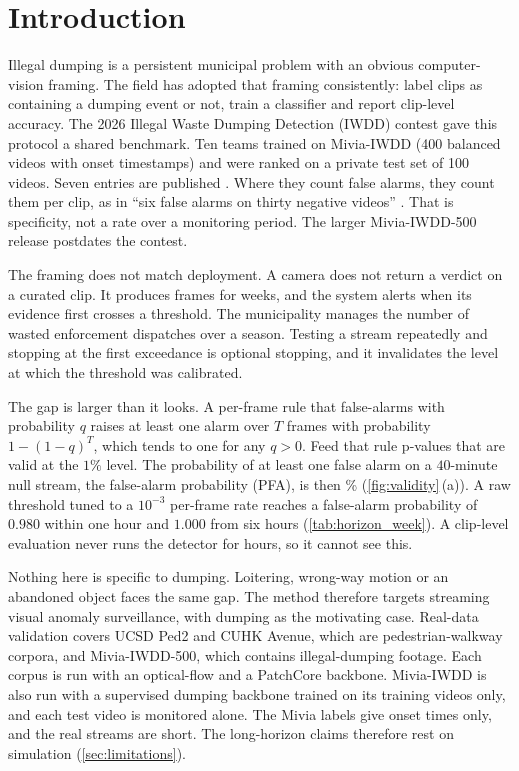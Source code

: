 \section{Introduction}
\label{sec:intro}

Illegal dumping is a persistent municipal problem with an obvious
computer-vision framing. The field has adopted that framing consistently: label
clips as containing a dumping event or not, train a classifier and report
clip-level accuracy. The 2026 Illegal Waste Dumping Detection (IWDD) contest \citep{bouwmans2026overview} gave this
protocol a shared benchmark. Ten teams trained on Mivia-IWDD (400 balanced
videos with onset timestamps) and were ranked on a private test set of 100 videos.
Seven entries are published
\citep{almorsy2026x3d,kim2026kfold,scarrica2026garberus,kairanbay2026vlm,zbuce2026novelty,bhat2026imslab,putzu2026unicass}.
Where they count false alarms, they count them per clip, as in ``six false alarms
on thirty negative videos'' \citep{almorsy2026x3d}. That is specificity, not a
rate over a monitoring period. The larger Mivia-IWDD-500 release
\citep{greco2026iwdd} postdates the contest.

The framing does not match deployment. A camera does not return a verdict on a
curated clip. It produces frames for weeks, and the system alerts when its
evidence first crosses a threshold. The municipality manages the number of wasted
enforcement dispatches over a season. Testing a stream repeatedly and stopping at
the first exceedance is optional stopping, and it invalidates the level at which
the threshold was calibrated.

The gap is larger than it looks. A per-frame rule that false-alarms with
probability $q$ raises at least one alarm over $T$ frames with probability
$1-(1-q)^{T}$, which tends to one for any $q>0$. Feed that rule p-values that are
valid at the $1\%$ level. The probability of at least one false alarm on a $40$-minute null stream, the false-alarm probability (PFA), is then \ValidityPfaPvaluePct\% (\cref{fig:validity}\,(a)). A
raw threshold tuned to a $10^{-3}$ per-frame rate reaches a false-alarm probability
of $0.980$ within one hour and $1.000$ from six hours (\cref{tab:horizon_week}). A
clip-level evaluation never runs the detector for hours, so it cannot see this.

Nothing here is specific to dumping. Loitering, wrong-way motion or an abandoned
object faces the same gap. The method therefore targets streaming visual anomaly
surveillance, with dumping as the motivating case. Real-data validation covers UCSD
Ped2 and CUHK Avenue, which are pedestrian-walkway corpora, and Mivia-IWDD-500,
which contains illegal-dumping footage. Each corpus is run with an optical-flow and a PatchCore backbone. Mivia-IWDD is also run with a supervised dumping backbone trained on its training videos only, and each test video is monitored alone. The Mivia labels give
onset times only, and the real streams are short. The long-horizon claims therefore
rest on simulation (\cref{sec:limitations}).

